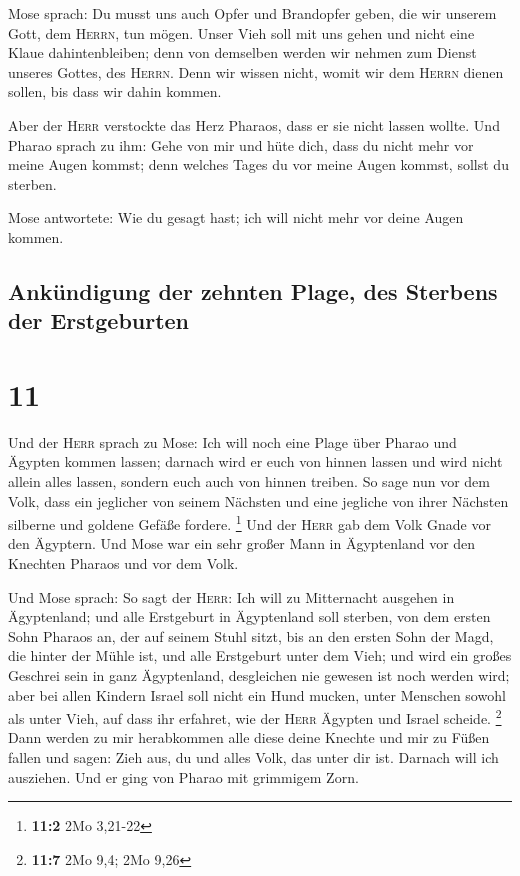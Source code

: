 Mose sprach: Du musst uns auch Opfer und Brandopfer
geben, die wir unserem Gott, dem \textsc{Herrn}, tun mögen.
 Unser Vieh soll mit uns gehen und nicht eine Klaue
dahintenbleiben; denn von demselben werden wir nehmen zum Dienst unseres
Gottes, des \textsc{Herrn}. Denn wir wissen nicht, womit wir dem
\textsc{Herrn} dienen sollen, bis dass wir dahin kommen.

 Aber der \textsc{Herr} verstockte das Herz Pharaos, dass
er sie nicht lassen wollte.  Und Pharao sprach zu ihm:
Gehe von mir und hüte dich, dass du nicht mehr vor meine Augen kommst;
denn welches Tages du vor meine Augen kommst, sollst du sterben.

 Mose antwortete: Wie du gesagt hast; ich will nicht mehr
vor deine Augen kommen.

\hypertarget{ankuxfcndigung-der-zehnten-plage-des-sterbens-der-erstgeburten}{%
\subsection{Ankündigung der zehnten Plage, des Sterbens der
Erstgeburten}\label{ankuxfcndigung-der-zehnten-plage-des-sterbens-der-erstgeburten}}

\hypertarget{section-10}{%
\section{11}\label{section-10}}

 Und der \textsc{Herr} sprach zu Mose: Ich will noch eine
Plage über Pharao und Ägypten kommen lassen; darnach wird er euch von
hinnen lassen und wird nicht allein alles lassen, sondern euch auch von
hinnen treiben.  So sage nun vor dem Volk, dass ein
jeglicher von seinem Nächsten und eine jegliche von ihrer Nächsten
silberne und goldene Gefäße fordere. \footnote{\textbf{11:2} 2Mo 3,21-22}
 Und der \textsc{Herr} gab dem Volk Gnade vor den
Ägyptern. Und Mose war ein sehr großer Mann in Ägyptenland vor den
Knechten Pharaos und vor dem Volk.

 Und Mose sprach: So sagt der \textsc{Herr}: Ich will zu
Mitternacht ausgehen in Ägyptenland;  und alle Erstgeburt
in Ägyptenland soll sterben, von dem ersten Sohn Pharaos an, der auf
seinem Stuhl sitzt, bis an den ersten Sohn der Magd, die hinter der
Mühle ist, und alle Erstgeburt unter dem Vieh;  und wird
ein großes Geschrei sein in ganz Ägyptenland, desgleichen nie gewesen
ist noch werden wird;  aber bei allen Kindern Israel soll
nicht ein Hund mucken, unter Menschen sowohl als unter Vieh, auf dass
ihr erfahret, wie der \textsc{Herr} Ägypten und Israel scheide.
\footnote{\textbf{11:7} 2Mo 9,4; 2Mo 9,26}  Dann werden zu
mir herabkommen alle diese deine Knechte und mir zu Füßen fallen und
sagen: Zieh aus, du und alles Volk, das unter dir ist. Darnach will ich
ausziehen. Und er ging von Pharao mit grimmigem Zorn.

